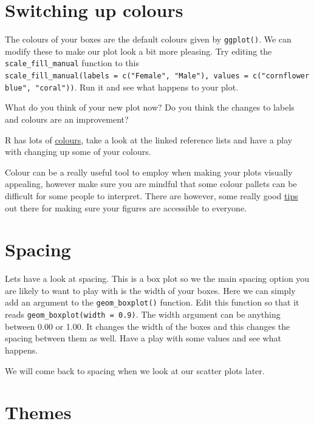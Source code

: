 \documentclass[
]{book}
\begin{document}
\section{Switching up colours}\label{colours}

The colours of your boxes are the default colours given by \texttt{ggplot()}. We can modify these to make our plot look a bit more pleasing. Try editing the \texttt{scale\_fill\_manual} function to this \texttt{scale\_fill\_manual(labels\ =\ c("Female",\ "Male"),\ values\ =\ c("cornflowerblue",\ "coral"))}. Run it and see what happens to your plot.

What do you think of your new plot now? Do you think the changes to labels and colours are an improvement?

R has lots of \href{https://www.datanovia.com/en/blog/awesome-list-of-657-r-color-names/}{colours}, take a look at the linked reference lists and have a play with changing up some of your colours.

Colour can be a really useful tool to employ when making your plots visually appealing, however make sure you are mindful that some colour pallets can be difficult for some people to interpret. There are however, some really good \href{https://www.tableau.com/en-gb/about/blog/examining-data-viz-rules-dont-use-red-green-together\#:~:text=Use\%20a\%20colour\%2Dblind\%2Dfriendly\%20palette\%20when\%20appropriate&text=For\%20example\%2C\%20blue\%2Forange\%20is,blue\%20to\%20someone\%20with\%20CVD}{tips} out there for making sure your figures are accessible to everyone.

\section{Spacing}\label{spacing}

Lets have a look at spacing. This is a box plot so we the main spacing option you are likely to want to play with is the width of your boxes. Here we can simply add an argument to the \texttt{geom\_boxplot()} function. Edit this function so that it reads \texttt{geom\_boxplot(width\ =\ 0.9)}. The width argument can be anything between 0.00 or 1.00. It changes the width of the boxes and this changes the spacing between them as well. Have a play with some values and see what happens.

We will come back to spacing when we look at our scatter plots later.

\section{Themes}\label{themes}
\end{document}
